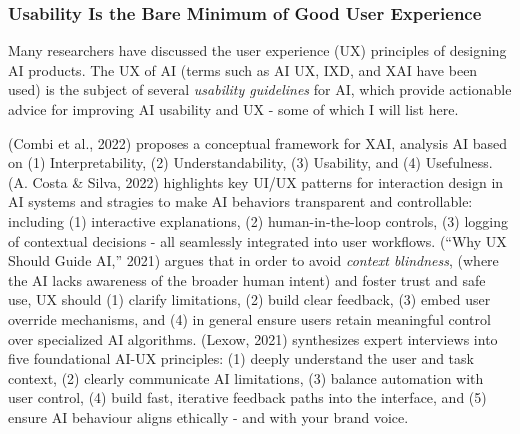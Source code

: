 \documentclass[
  12pt,
  letterpaper,
  DIV=11,
  numbers=noendperiod]{scrartcl}
\begin{document}
\let\pandoctableshortcapt\relax

\subsubsection{Usability Is the Bare Minimum of Good User
Experience}\label{usability-is-the-bare-minimum-of-good-user-experience}

Many researchers have discussed the user experience (UX) principles of
designing AI products. The UX of AI (terms such as AI UX, IXD, and XAI
have been used) is the subject of several \emph{usability guidelines}
for AI, which provide actionable advice for improving AI usability and
UX - some of which I will list here.

(Combi et al., 2022) proposes a conceptual framework for XAI, analysis
AI based on (1) Interpretability, (2) Understandability, (3) Usability,
and (4) Usefulness. (A. Costa \& Silva, 2022) highlights key UI/UX
patterns for interaction design in AI systems and stragies to make AI
behaviors transparent and controllable: including (1) interactive
explanations, (2) human-in-the-loop controls, (3) logging of contextual
decisions - all seamlessly integrated into user workflows. ({``Why {UX}
Should Guide {AI},''} 2021) argues that in order to avoid \emph{context
blindness}, (where the AI lacks awareness of the broader human intent)
and foster trust and safe use, UX should (1) clarify limitations, (2)
build clear feedback, (3) embed user override mechanisms, and (4) in
general ensure users retain meaningful control over specialized AI
algorithms. (Lexow, 2021) synthesizes expert interviews into five
foundational AI-UX principles: (1) deeply understand the user and task
context, (2) clearly communicate AI limitations, (3) balance automation
with user control, (4) build fast, iterative feedback paths into the
interface, and (5) ensure AI behaviour aligns ethically - and with your
brand voice.
\end{document}
